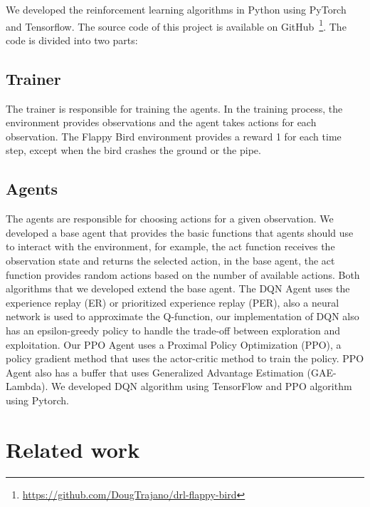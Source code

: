 \documentclass[letterpaper]{article}
\begin{document}

We developed the reinforcement learning algorithms in Python using PyTorch and Tensorflow. The source code of this project is available on GitHub~\footnote{\url{https://github.com/DougTrajano/drl-flappy-bird}}. The code is divided into two parts:

\subsection{Trainer}

The trainer is responsible for training the agents. In the training process, the environment provides observations and the agent takes actions for each observation. The Flappy Bird environment provides a reward 1 for each time step, except when the bird crashes the ground or the pipe. 

\subsection{Agents}

The agents are responsible for choosing actions for a given observation. We developed a base agent that provides the basic functions that agents should use to interact with the environment, for example, the act function receives the observation state and returns the selected action, in the base agent, the act function provides random actions based on the number of available actions. Both algorithms that we developed extend the base agent. The DQN Agent uses the experience replay (ER) or prioritized experience replay (PER), also a neural network is used to approximate the Q-function, our implementation of DQN also has an epsilon-greedy policy to handle the trade-off between exploration and exploitation. Our PPO Agent uses a Proximal Policy Optimization (PPO), a policy gradient method that uses the actor-critic method to train the policy. PPO Agent also has a buffer that uses Generalized Advantage Estimation (GAE-Lambda). We developed DQN algorithm using TensorFlow and PPO algorithm using Pytorch.

\section{Related work}
\end{document}
